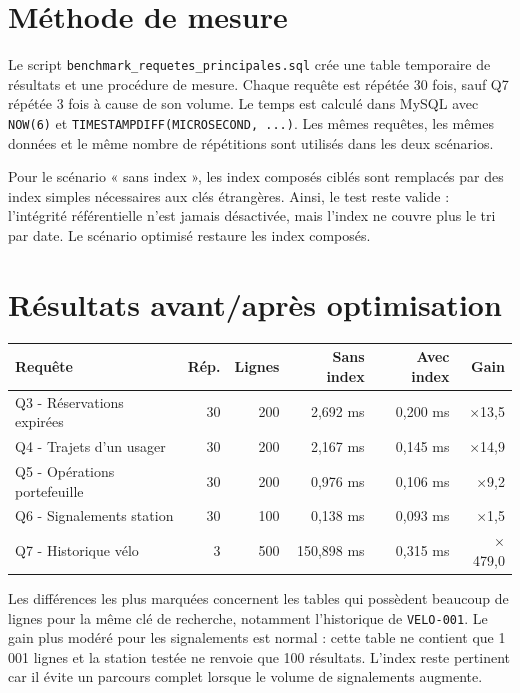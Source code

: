 \documentclass[11pt,a4paper]{article}
\begin{document}
\section{Méthode de mesure}
Le script \texttt{benchmark\_requetes\_principales.sql} crée une table temporaire de résultats et une procédure de mesure. Chaque requête est répétée 30 fois, sauf Q7 répétée 3 fois à cause de son volume. Le temps est calculé dans MySQL avec \texttt{NOW(6)} et \texttt{TIMESTAMPDIFF(MICROSECOND, ...)}. Les mêmes requêtes, les mêmes données et le même nombre de répétitions sont utilisés dans les deux scénarios.

Pour le scénario « sans index », les index composés ciblés sont remplacés par des index simples nécessaires aux clés étrangères. Ainsi, le test reste valide : l'intégrité référentielle n'est jamais désactivée, mais l'index ne couvre plus le tri par date. Le scénario optimisé restaure les index composés.

\section{Résultats avant/après optimisation}
\begin{center}
\small
\begin{tabular}{p{}rrrrr}
\toprule
\textbf{Requête} & \textbf{Rép.} & \textbf{Lignes} & \textbf{Sans index} & \textbf{Avec index} & \textbf{Gain}\\
\midrule
Q3 - Réservations expirées & 30 & 200 & 2,692 ms & 0,200 ms & $\times$13,5\\
Q4 - Trajets d'un usager & 30 & 200 & 2,167 ms & 0,145 ms & $\times$14,9\\
Q5 - Opérations portefeuille & 30 & 200 & 0,976 ms & 0,106 ms & $\times$9,2\\
Q6 - Signalements station & 30 & 100 & 0,138 ms & 0,093 ms & $\times$1,5\\
Q7 - Historique vélo & 3 & 500 & 150,898 ms & 0,315 ms & $\times$479,0\\
\bottomrule
\end{tabular}
\end{center}

Les différences les plus marquées concernent les tables qui possèdent beaucoup de lignes pour la même clé de recherche, notamment l'historique de \texttt{VELO-001}. Le gain plus modéré pour les signalements est normal : cette table ne contient que 1\,001 lignes et la station testée ne renvoie que 100 résultats. L'index reste pertinent car il évite un parcours complet lorsque le volume de signalements augmente.
\end{document}
